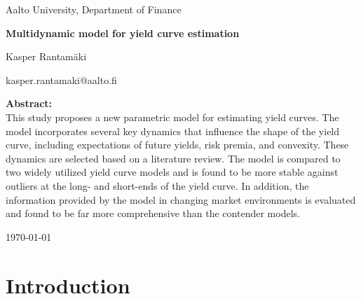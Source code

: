 \documentclass[a4paper]{artikel3}
\numberwithin{equation}{section}
\numberwithin{theorem}{section}
\numberwithin{proposition}{section}
\numberwithin{lemma}{section}
\begin{document}
{
\thispagestyle{empty}

{\large                       
Aalto University, Department of Finance
}

\vspace{5cm}               

{\huge \bf                    
Multidynamic model for yield curve estimation
}

\vspace{1cm}


{\large
Kasper Rantamäki
\par
kasper.rantamaki@aalto.fi}
}

\vspace{3.5cm}

{\large \bf
Abstract: \\
}
{
This study proposes a new parametric model for estimating yield curves. The model incorporates several key dynamics that influence the shape of the yield curve, including expectations of future yields, risk premia, and convexity. These dynamics are selected based on a literature review. The model is compared to two widely utilized yield curve models and is found to be more stable against outliers at the long- and short-ends of the yield curve. In addition, the information provided by the model in changing market environments is evaluated and found to be far more comprehensive than the contender models.
}


\vfill

{\large \today}


\clearpage


\thispagestyle{empty}


\tableofcontents


\clearpage


\section{Introduction}
\label{sec:intro}

\thispagestyle{empty}
\end{document}
